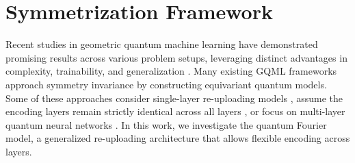 \documentclass[%
 reprint,
 amsmath,amssymb,
 aps,
 pra,
]{revtex4-2}
\theoremstyle{definition}
\begin{document}
\section{Symmetrization Framework}
\label{sec:GQML}

Recent studies in geometric quantum machine learning have demonstrated promising results across various problem setups, leveraging distinct advantages in complexity, trainability, and generalization \cite{Larocca2022,Meyer2023,Michael2023,Cenk2024,Louis2024,Nguyen2024,Kazi2024,Sauvage2024,Das2025}. Many existing GQML frameworks approach symmetry invariance by constructing equivariant quantum models. Some of these approaches consider single-layer re-uploading models \cite{Larocca2022,Michael2023}, assume the encoding layers remain strictly identical across all layers \cite{Meyer2023,nha2025}, or focus on multi-layer quantum neural networks \cite{Michael2023,Louis2024,Nguyen2024}. In this work, we investigate the quantum Fourier model, a generalized re-uploading architecture that allows flexible encoding across layers.
\end{document}
